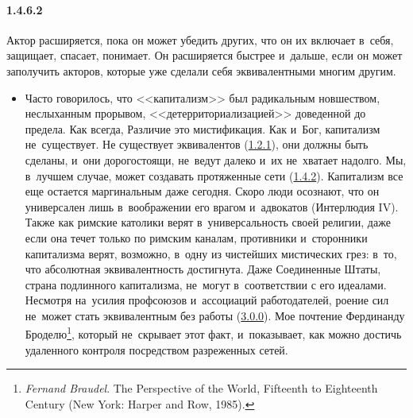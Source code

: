\paragraph{1.4.6.2}\hypertarget{par:1.4.6.2}{} Актор расширяется, пока он может убедить других, что он их включает в~себя, защищает, спасает, понимает. Он расширяется быстрее и~дальше, если он может заполучить акторов, которые уже сделали себя эквивалентными многим другим.
	\begin{itemize}
	\item Часто говорилось, что <<капитализм>> был радикальным новшеством, неслыханным прорывом, <<детерриториализацией>> доведенной до предела. Как всегда, Различие это мистификация. Как и~Бог, капитализм не~существует. Не существует эквивалентов (\hyperlink{par:1.2.1}{1.2.1}), они должны быть сделаны, и~они дорогостоящи, не~ведут далеко и~их не~хватает надолго. Мы, в~лучшем случае, может создавать протяженные сети (\hyperlink{par:1.4.2}{1.4.2}). Капитализм все еще остается маргинальным даже сегодня. Скоро люди осознают, что он универсален лишь в~воображении его врагом и~адвокатов (Интерлюдия IV). Также как римские католики верят в~универсальность своей религии, даже если она течет только по римским каналам, противники и~сторонники капитализма верят, возможно, в~одну из чистейших мистических грез: в~то, что абсолютная эквивалентность достигнута. Даже Соединенные Штаты, страна подлинного капитализма, не~могут в~соответствии с его идеалами. Несмотря на~усилия профсоюзов и~ассоциаций работодателей, роение сил не~может стать эквивалентным без работы (\hyperlink{par:3.0.0}{3.0.0}). Мое почтение Фердинанду Броделю\footnote{{\itshape Fernand Braudel}. The Perspective of the World, Fifteenth to Eighteenth Century (New York: Harper and Row, 1985).}, который не~скрывает этот факт, и~показывает, как можно достичь удаленного контроля посредством разреженных сетей.
	\end{itemize}

